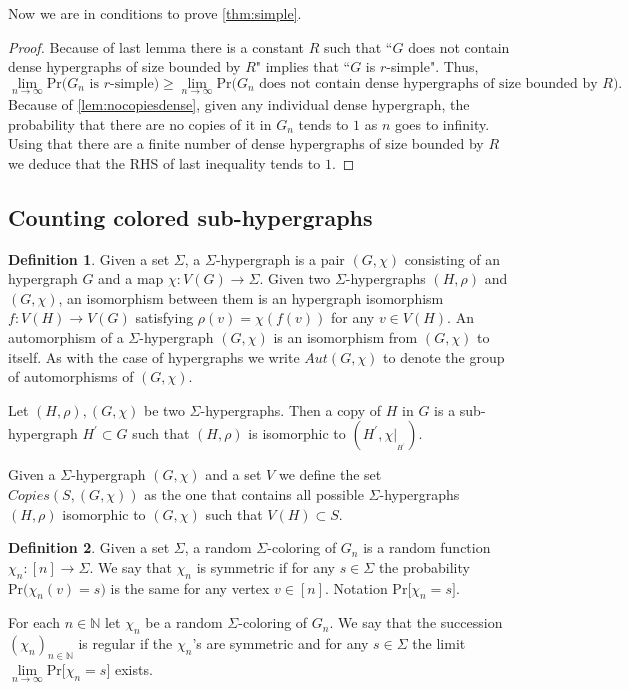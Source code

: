 \documentclass[12pt,notitlepage,a4paper]{article}
\theoremstyle{definition}
\newtheorem{definition}{Definition}[section]
\newcommand{\N}{\mathbb{N}}
\newcommand{\Ln}{\lim\limits_{n\to \infty}}
\begin{document}
Now we are in conditions to prove \cref{thm:simple}.

\begin{proof}
	Because of last lemma there is a constant $R$ such that 
	``$G$ does not contain dense hypergraphs of size bounded by $R$" implies
	that ``$G$ is $r$-simple". Thus,
	\[ \Ln \mathrm{Pr}\big( G_n \text{ is } r \text{-simple}  \big)
	\geq \Ln \mathrm{Pr} \big( G_n \text{ does not contain dense 
	hypergraphs of size bounded by } R\big).\] 
	Because of	\cref{lem:nocopiesdense}, given any individual dense hypergraph,
	the probability that there are no copies
	of it in $G_n$ tends to $1$ as $n$ goes to infinity. Using that
	there are a finite number of dense hypergraphs of size bounded by
	$R$ we deduce that the RHS of last inequality tends to $1$. 
\end{proof}

\subsection{Counting colored sub-hypergraphs}


\begin{definition} 
	Given a set $\Sigma$, a $\Sigma$-hypergraph is a pair
	$(G,\chi)$ consisting of an hypergraph $G$ and a map 
	$\chi: V(G) \rightarrow \Sigma$.  
	Given two $\Sigma$-hypergraphs $(H,\rho)$ and $(G,\chi)$,
	an isomorphism between them is an hypergraph isomorphism 
	$f:V(H)\rightarrow V(G)$ satisfying $\rho(v)=\chi(f(v))$
	for any $v\in V(H)$. 
	An automorphism of a $\Sigma$-hypergraph $(G,\chi)$ is an
	isomorphism from $(G,\chi)$ to itself. As with the case of
	hypergraphs we write $Aut(G,\chi)$ to denote the group of 
	automorphisms of $(G,\chi)$.
	\par
	Let $(H,\rho), (G,\chi)$ be two $\Sigma$-hypergraphs. 
	Then a copy of $H$ in $G$ is
	a sub-hypergraph $H^\prime\subset G$ such that 
	$(H,\rho)$ is isomorphic to 
	$(H^\prime,\chi|_{_{H^\prime}})$.\par
	Given a $\Sigma$-hypergraph $(G,\chi)$ and a set $V$ we
	define the set $Copies(S,(G, \chi))$ as the one that contains all 
	possible $\Sigma$-hypergraphs $(H,\rho)$ isomorphic to $(G,\chi)$ 
	such that $V(H)\subset S$.	
\end{definition}

\begin{definition}
	Given a set $\Sigma$, a random $\Sigma$-coloring of $G_n$ is 
	a random function $\chi_n: [n]\rightarrow \Sigma$. We say that	
	$\chi_n$ is symmetric if for any $s\in \Sigma$ the probability
	$\mathrm{Pr}\big( \chi_n(v)=s \big)$ is the same for any vertex
	$v\in [n]$. Notation $\mathrm{Pr}\big[\chi_n=s\big]$. \par
	For each $n\in \N$ let $\chi_n$ be a random $\Sigma$-coloring of $G_n$.
	We say that the succession $(\chi_n)_{n\in \N}$ is regular if
	the $\chi_n$'s are symmetric and for any $s\in \Sigma$ the limit
	$\Ln \mathrm{Pr}\big[ \chi_n = s \big]$ exists. 
\end{definition}
\end{document}
